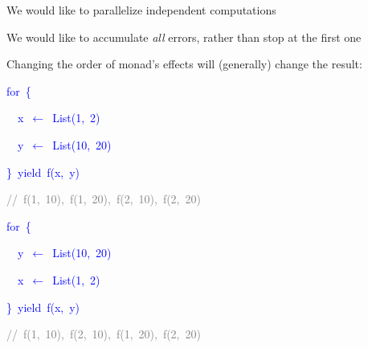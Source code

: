 We would like to parallelize independent computations

We would like to accumulate \emph{all} errors, rather than stop at
the first one

Changing the order of monad's effects will (generally) change the
result:\texttt{\textcolor{blue}{\footnotesize{}\medskip{}
}}{\footnotesize\par}

\texttt{\textcolor{blue}{\footnotesize{}}}%
\begin{minipage}[c][1\totalheight][t]{0.49\columnwidth}%
\begin{lyxcode}
\textcolor{blue}{\footnotesize{}for~\{}{\footnotesize\par}

\textcolor{blue}{\footnotesize{}~~x~$\leftarrow$~List(1,~2)}{\footnotesize\par}

\textcolor{blue}{\footnotesize{}~~y~$\leftarrow$~List(10,~20)}{\footnotesize\par}

\textcolor{blue}{\footnotesize{}\}~yield~f(x,~y)}{\footnotesize\par}

\textrm{\textcolor{gray}{\footnotesize{}//~f(1,~10),~f(1,~20),~f(2,~10),~f(2,~20)}}{\footnotesize\par}
\end{lyxcode}
%
\end{minipage}\texttt{\textcolor{blue}{\footnotesize{}\hfill{}}}%
\begin{minipage}[c][1\totalheight][t]{0.49\columnwidth}%
\begin{lyxcode}
\textcolor{blue}{\footnotesize{}for~\{}{\footnotesize\par}

\textcolor{blue}{\footnotesize{}~~y~$\leftarrow$~List(10,~20)}{\footnotesize\par}

\textcolor{blue}{\footnotesize{}~~x~$\leftarrow$~List(1,~2)}{\footnotesize\par}

\textcolor{blue}{\footnotesize{}\}~yield~f(x,~y)}{\footnotesize\par}

\textrm{\textcolor{gray}{\footnotesize{}//~f(1,~10),~f(2,~10),~f(1,~20),~f(2,~20)}}{\footnotesize\par}
\end{lyxcode}
%
\end{minipage}\texttt{\textcolor{blue}{\footnotesize{}\hfill{}\medskip{}
}}{\footnotesize\par}

